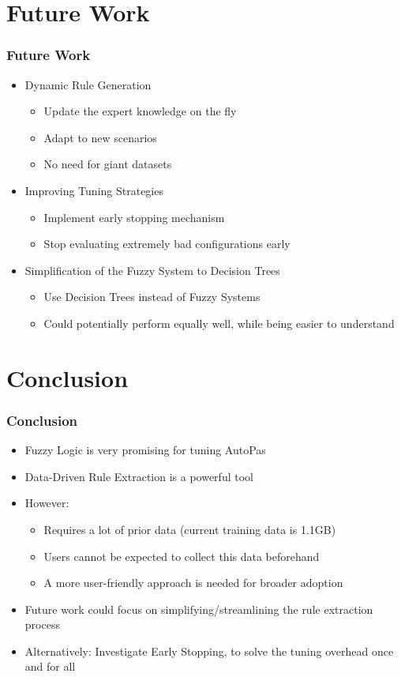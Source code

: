 \documentclass[
	10pt,
	t		%
]{beamer}
\begin{document}
\section{Future Work}
\begin{frame}
	\frametitle{Future Work}
	\begin{itemize}
		\item Dynamic Rule Generation
		      \begin{itemize}
			      \item Update the expert knowledge on the fly
			      \item Adapt to new scenarios
			      \item No need for giant datasets
		      \end{itemize}
		\item Improving Tuning Strategies
		      \begin{itemize}
			      \item Implement early stopping mechanism
			      \item Stop evaluating extremely bad configurations early
		      \end{itemize}
		\item Simplification of the Fuzzy System to Decision Trees
		      \begin{itemize}
			      \item Use Decision Trees instead of Fuzzy Systems
			      \item Could potentially perform equally well, while being easier to understand
		      \end{itemize}
	\end{itemize}
\end{frame}


\section{Conclusion}
\begin{frame}
	\frametitle{Conclusion}
	\begin{itemize}
		\item Fuzzy Logic is very promising for tuning AutoPas
		\item Data-Driven Rule Extraction is a powerful tool
		\item However:
		      \begin{itemize}
			      \item Requires a lot of  prior data (current training data is 1.1GB)
			      \item Users cannot be expected to collect this data beforehand
			      \item A more user-friendly approach is needed for broader adoption
		      \end{itemize}
		\item Future work could focus on simplifying/streamlining the rule extraction process
		\item Alternatively: Investigate Early Stopping, to solve the tuning overhead once and for all
	\end{itemize}
\end{frame}
\end{document}
